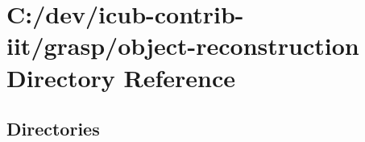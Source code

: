 \section{C\+:/dev/icub-\/contrib-\/iit/grasp/object-\/reconstruction Directory Reference}
\label{dir_b0086667da1492289d921cb2a869f903}
\subsection*{Directories}
\begin{DoxyCompactItemize}
\end{DoxyCompactItemize}
